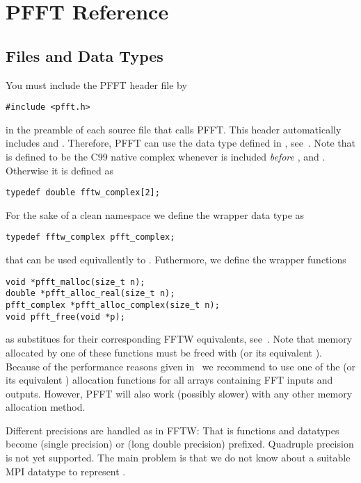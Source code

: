 \chapter{PFFT Reference}\label{chap:ref}

\section{Files and Data Types}
You must include the PFFT header file by
\begin{lstlisting}
#include <pfft.h>
\end{lstlisting}
in the preamble of each source file that calls PFFT. This header automatically includes  and .
Therefore, PFFT can use the  data type defined in , see~\cite{fftw-cplx-num}.
Note that  is defined to be the C99 native complex whenever  is included \emph{before}
,  and . Otherwise it is defined as 
\begin{lstlisting}
typedef double fftw_complex[2];
\end{lstlisting}
For the sake of a clean namespace we define the wrapper data type  as
\begin{lstlisting}
typedef fftw_complex pfft_complex;
\end{lstlisting}
that can be used equivallently to .
Futhermore, we define the wrapper functions
\begin{lstlisting}
void *pfft_malloc(size_t n);
double *pfft_alloc_real(size_t n);
pfft_complex *pfft_alloc_complex(size_t n);
void pfft_free(void *p);
\end{lstlisting}
as substitues for their corresponding FFTW equivalents, see~\cite{fftw-malloc}. 
Note that memory allocated by one
of these functions must be freed with  (or its equivalent ).
Because of the performance reasons given in~\cite{fftw-align-mem}
we recommend to use one of the  (or its equivalent ) allocation functions
for all arrays containing FFT inputs and outputs.
However, PFFT will also work (possibly slower) with any other memory allocation method.

Different precisions are handled as in FFTW: That is  functions and datatypes become  (single precision)
or  (long double precision) prefixed. Quadruple precision is not yet supported. 
The main problem is that we do not know about a suitable MPI datatype to represent .


